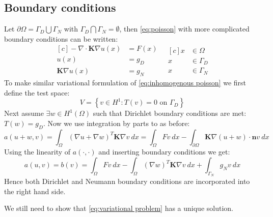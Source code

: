 \documentclass[../Main/main.tex]{subfiles}
\begin{document}
	\subsection*{Boundary conditions}
	Let $\partial \Omega = \Gamma_D\bigcup \Gamma_N$ with $\Gamma_D \bigcap \Gamma_N = \emptyset$, then \eqref{eq:poisson} with more complicated boundary conditions can be written:
	\begin{equation}\label{eq:inhomogenous poisson}
		\begin{aligned}[c]
			 - \nabla \cdot \pmb{K} \nabla u(x) &= F(x) \\
			u(x) &= g_D \\
			\pmb{K}\nabla u(x) &= g_N
		\end{aligned}
		\ \ \
		\begin{aligned}[c]
			x &\in \Omega  \\
			x &\in \Gamma_D \\
			x &\in \Gamma_N
		\end{aligned}
	\end{equation}
	To make similar variational formulation of \eqref{eq:inhomogenous poisson} we first define the test space:
	\begin{equation}
		V = \left \{ v\in H^1: T(v)=0 \text{ on }\Gamma_D\right \}
	\end{equation}
	Next assume $\exists w \in H^1(\Omega)$ such that Dirichlet boundary conditions are met: $T(w)=g_D$. Now we use integration by parts to as before:
	\begin{equation}
		a(u+w,v) = \int_{\Omega}(\nabla u+\nabla w)^{T}\pmb{K} \nabla v \ dx = \int_{\Omega}Fv \ dx -\int_{\partial\Omega}\pmb{K}\nabla (u+w)\cdot \pmb{n}v \ dx 
	\end{equation}
	Using the linearity of $a(\cdot,\cdot)$ and inserting boundary conditions we get:
	\begin{equation}\label{eq:inhomogenous poisson weak}
		a(u,v) = b(v)= \int_{\Omega} Fv \ dx - \int_{\Omega}(\nabla w)^T\pmb{K} \nabla v \ dx + \int_{\Gamma_N} g_N v \ dx
	\end{equation}
	Hence both Dirichlet and Neumann boundary conditions are incorporated into the right hand side.\par
	We still need to show that \eqref{eq:variational problem} has a unique solution.
	
\end{document}
